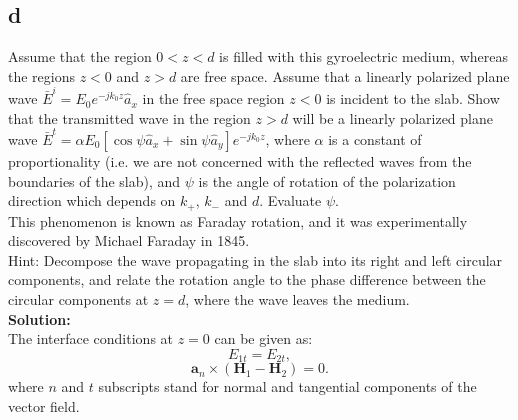 \documentclass[11pt]{amsart}
\begin{document}
\subsection*{d}
Assume that the region $0<z<d$ is filled with this gyroelectric medium, whereas the
regions $z<0$ and $z>d$ are free space. Assume that a linearly polarized plane wave $\bar{E}^i=E_0 e^{-j k_0 z}\hat{a}_x$ in the free space region $z<0$ is incident to the slab. Show that the transmitted wave in the region $z>d$ will be a linearly polarized plane wave $\bar{E}^t=\alpha E_0 \left [ \cos \psi \hat{a}_x + \sin \psi \hat{a}_y  \right ]e^{-j k_0 z}$, where $\alpha$ is a constant of proportionality (i.e. we are
not concerned with the reflected waves from the boundaries of the slab), and $\psi$ is the
angle of rotation of the polarization direction which depends on $k_+$, $k_-$ and $d$. Evaluate $\psi$.
\\
This phenomenon is known as Faraday rotation, and it was experimentally discovered by Michael Faraday in 1845.
\\
Hint: Decompose the wave propagating in the slab into its right and left circular
components, and relate the rotation angle to the phase difference between the circular
components at $z=d$, where the wave leaves the medium.
\\
\textbf{Solution:}\\

The interface conditions at $z=0$ can be given as:
\begin{equation}
E_{1t}=E_{2t},
\end{equation}
\begin{equation}
\label{eq:18}
\mathbf{a}_{n}\times(\mathbf{H}_{1}-\mathbf{H}_{2})=0.
\end{equation}
where $n$ and $t$ subscripts stand for normal and tangential components of the vector field. 
\end{document}
